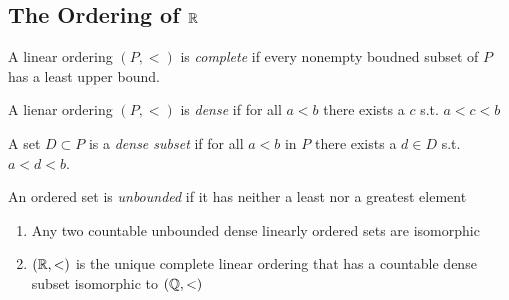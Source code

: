\documentclass[11pt]{article}
\begin{document}
\subsection{The Ordering of \(\mathbb{R}\)}
\label{sec:org3fbffff}
A linear ordering \((P,<)\) is \emph{complete} if every nonempty boudned subset of \(P\)
has a least upper bound.

\begin{definition}[]
A lienar ordering \((P,<)\) is \emph{dense} if for all \(a<b\) there exists a \(c\) s.t.
\(a<c<b\)

A set \(D\subset P\) is a \emph{dense subset} if for all \(a<b\) in \(P\) there exists a
\(d\in D\) s.t. \(a<d<b\).

An ordered set is \emph{unbounded} if it has neither a least nor a greatest element
\end{definition}

\begin{theorem}[Cantor]
\begin{enumerate}
\item Any two countable unbounded dense linearly ordered sets are isomorphic
\item \((\mathbb{R},<)\) is the unique complete linear ordering that has a countable dense
subset isomorphic to \((\mathbb{Q},<)\)
\end{enumerate}
\end{theorem}
\end{document}
